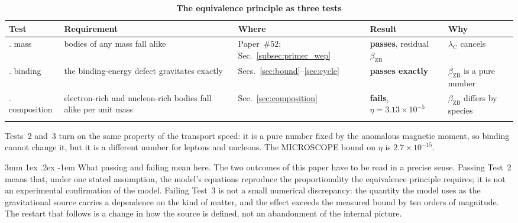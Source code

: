 \documentclass[%
 reprint, amsmath,amssymb, aps, prb, ]{revtex4-2}
\makeatletter
\numberwithin{equation}{section}
\renewcommand\paragraph{%
  \@startsection{paragraph}{4}{\z@}%
    {3mm \@plus 1ex \@minus .2ex}%
    {-1em}%
    {\normalfont\normalsize\itshape}}
\newcommand{\betaZB}{\beta_{\text{ZB}}}
\newcommand{\lambdaC}{\lambda_{\text{C}}}
\makeatother
\begin{document}
\begin{table}[t!]
\centering
\caption{\textbf{The equivalence principle as three tests}}
\label{tab:threetests}
\renewcommand{\arraystretch}{1.4}
\setlength{\tabcolsep}{8pt}
\begin{tabular}{>{\raggedright\arraybackslash}p{2.0cm}>{\raggedright\arraybackslash}p{5.0cm}>{\raggedright\arraybackslash}p{2.8cm}>{\raggedright\arraybackslash}p{2.6cm}>{\raggedright\arraybackslash}p{2.4cm}}
\toprule
\textbf{Test} & \textbf{Requirement} & \textbf{Where} & \textbf{Result} & \textbf{Why} \\
\midrule
1. mass & bodies of any mass fall alike & Paper~\#52; Sec.~\ref{subsec:primer_wep} & \textcolor{pass}{\textbf{passes}}, residual $\betaZB$ & $\lambdaC$ cancels \\
\addlinespace[0.3cm]
2. binding & the binding-energy defect gravitates exactly & Secs.~\ref{sec:bound}--\ref{sec:cycle} & \textcolor{pass}{\textbf{passes exactly}} & $\betaZB$ is a pure number \\
\addlinespace[0.3cm]
3. composition & electron-rich and nucleon-rich bodies fall alike per unit mass & Sec.~\ref{sec:composition} & \textcolor{fail}{\textbf{fails}}, $\eta = 3.13\times10^{-5}$ & $\betaZB$ differs by species \\
\addlinespace[0.2cm]
\bottomrule
\end{tabular}
\vspace{0.2cm}
\begin{minipage}{0.95\textwidth}
\justifying\footnotesize
Tests~2 and~3 turn on the same property of the transport speed: it is a pure number fixed by the anomalous magnetic moment, so binding cannot change it, but it is a different number for leptons and nucleons. The MICROSCOPE bound on $\eta$ is $2.7\times10^{-15}$.
\end{minipage}
\end{table}

\paragraph{What passing and failing mean here.} The two outcomes of this paper have to be read in a precise sense. Passing Test~2 means that, under one stated assumption, the model's equations reproduce the proportionality the equivalence principle requires; it is not an experimental confirmation of the model. Failing Test~3 is not a small numerical discrepancy: the quantity the model uses as the gravitational source carries a dependence on the kind of matter, and the effect exceeds the measured bound by ten orders of magnitude. The restart that follows is a change in how the source is defined, not an abandonment of the internal picture.
\end{document}
